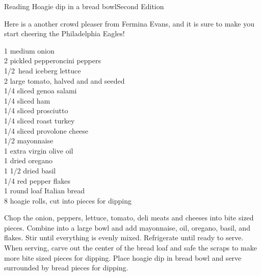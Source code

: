\begin{entry}{Reading Hoagie dip in a bread bowl}{Second Edition}

\begin{open}
  Here is a another crowd pleaser from Fermina Evans, and it is sure to make
  you start cheering the Philadelphia Eagles!
\end{open}

\begin{ingredients}
    1 medium onion\\
    2 pickled pepperoncini peppers\\
    \SI{1/2}{head} iceberg lettuce\\
    2 large tomato, halved and and seeded\\
    \SI{1/4}{\pound} sliced genoa salami\\
    \SI{1/4}{\pound} sliced ham\\
    \SI{1/4}{\pound} sliced prosciutto\\
    \SI{1/4}{\pound} sliced roast turkey\\
    \SI{1/4}{\pound} sliced provolone cheese\\
    \SI{1/2}{\cup} mayonnaise\\
    \SI{1}{\tblspoon} extra virgin olive oil\\
    \SI{1}{\teaspoon} dried oregano\\
    1 \SI{1/2}{\teaspoon} dried basil\\
    \SI{1/4}{\teaspoon} red pepper flakes\\
    1 round loaf Italian bread\\
    8 hoagie rolls, cut into pieces for dipping
\end{ingredients}
%
%
Chop the onion, peppers, lettuce, tomato, deli meats and cheeses into bite
sized pieces. Combine into a large bowl and add mayonnaise, oil, oregano,
basil, and flakes. Stir until everything is evenly mixed. Refrigerate until
ready to serve. When serving, carve out the center of the bread loaf and safe
the scraps to make more bite sized pieces for dipping. Place hoagie dip in
bread bowl and serve surrounded by bread pieces for dipping.
\end{entry}

